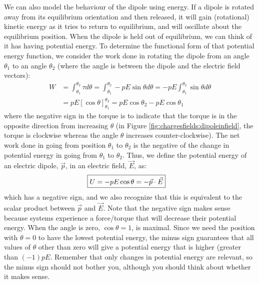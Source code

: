 We can also model the behaviour of the dipole using energy. If a dipole is rotated away from its equilibrium orientation and then released, it will gain (rotational) kinetic energy as it tries to return to equilibrium, and will oscillate about the equilibrium position. When the dipole is held out of equilibrium, we can think of it has having potential energy. To determine the functional form of that potential energy function, we consider the work done in rotating the dipole from an angle $\theta_1$ to an angle $\theta_2$ (where the angle is between the dipole and the electric field vectors):
\begin{align*}
W&=\int_{\theta_1}^{\theta_2} \tau d\theta=\int_{\theta_1}^{\theta_2} -pE\sin\theta d\theta=-pE\int_{\theta_1}^{\theta_2} \sin\theta d\theta\\
&=pE[\cos\theta]_{\theta_1}^{\theta_2}=pE\cos\theta_2-pE\cos\theta_1
\end{align*}
where the negative sign in the torque is to indicate that the torque is in the opposite direction from increasing $\theta$ (in Figure \ref{fig:chargesfields:dipoleinfield}, the torque is clockwise whereas the angle $\theta$ increases counter-clockwise). The net work done in going from position $\theta_1$ to $\theta_2$ is the negative of the change in potential energy in going from $\theta_1$ to $\theta_2$. Thus, we define the potential energy of an electric dipole, $\vec p$, in an electric field, $\vec E$, as:
\begin{align*}
\Aboxed{U=-pE\cos\theta=-\vec p\cdot \vec E}
\end{align*}
which has a negative sign, and we also recognize that this is equivalent to the scalar product between $\vec p$ and $\vec E$. Note that the negative sign makes sense because systems experience a force/torque that will decrease their potential energy. When the angle is zero, $\cos\theta=1$, is maximal. Since we need the position with $\theta=0$ to have the lowest potential energy, the minus sign guarantees that all values of $\theta$ other than zero will give a potential energy that is higher (greater than $(-1) pE$. Remember that only changes in potential energy are relevant, so the minus sign should not bother you, although you should think about whether it makes sense.

